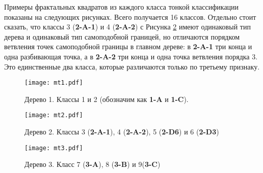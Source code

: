 Примеры фрактальных квадратов из каждого класса тонкой классификации показаны на следующих рисунках.
Всего получается 16 классов.
Отдельно стоит сказать, что классы 3 ({\bf 2-A-1}) и 4 ({\bf 2-A-2}) с Рисунка \ref{fig:tree2} имеют одинаковый тип дерева и одинаковый тип самоподобной границей, но отличаются порядком ветвления точек самоподобной границы в главном дереве: в {\bf 2-A-1} три конца и одна разбивающая точка, а в {\bf 2-A-2} три конца и одна точка ветвления порядка 3.
Это единственные два класса, которые различаются только по третьему признаку.


\begin{figure}[H]
    \centering
    \texttt{[image: mt1.pdf]}
    \vspace{0.5cm}
    \vfill
    \hfill
    \caption{Дерево 1. Классы 1 и 2 (обозначим как \textbf{1-A} и \textbf{1-C}). }
    \label{fig:tree1}
\end{figure}

\begin{figure}[H]
    \centering
    \texttt{[image: mt2.pdf]}
    \vspace{0.5cm}\vfill
    \hfill
    \vspace{0.3cm}\vfill
    \hfill
    \caption{Дерево 2. Классы 3 ({\bf 2-A-1}), 4 ({\bf 2-A-2}), 5 ({\bf 2-D6}) и 6 ({\bf 2-D3})}
    \label{fig:tree2}
\end{figure}

\begin{figure}[H]
    \centering
    \hspace{0.12\textwidth}
    \texttt{[image: mt3.pdf]}
    \hfill
    \vspace{0.3cm}\vfill
    \hfill
    \caption{Дерево 3. Класс 7 ({\bf 3-A}), 8 ({\bf 3-B}) и 9({\bf 3-C})}
    \label{fig:tree3}
\end{figure}
 
